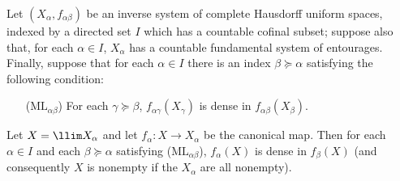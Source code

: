 \begin{theorem}\label{Mittag-Leffler inverse limit thm}
Let $(X_\alpha,f_{\alpha\beta})$ be an inverse system of complete Hausdorff uniform spaces, indexed by a directed set $I$ which has a countable cofinal subset; suppose also that, for each $\alpha\in I$, $X_\alpha$ has a countable fundamental system of entourages. Finally, suppose that for each $\alpha\in I$ there is an index $\beta\succeq\alpha$ satisfying the following condition:
\begin{enumerate}[leftmargin=40pt]
\item[($\text{ML}_{\alpha\beta}$)] For each $\gamma\succeq\beta$, $f_{\alpha\gamma}(X_\gamma)$ is dense in $f_{\alpha\beta}(X_\beta)$.
\end{enumerate}
Let $X=\llim X_\alpha$ and let $f_\alpha:X\to X_\alpha$ be the canonical map. Then for each $\alpha\in I$ and each $\beta\succeq\alpha$ satisfying ($\text{ML}_{\alpha\beta}$), $f_\alpha(X)$ is dense in $f_\beta(X)$ (and consequently $X$ is nonempty if the $X_\alpha$ are all nonempty).
\end{theorem}
